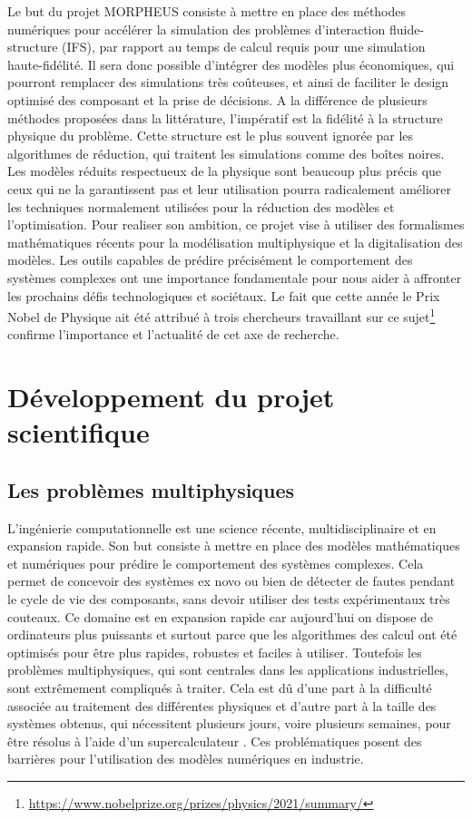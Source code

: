 \documentclass[12pt, french]{article}
\begin{document}
Le but du projet MORPHEUS consiste à mettre en place des méthodes numériques
pour accélérer la simulation des problèmes d'interaction fluide-structure (IFS), par rapport au temps de calcul requis pour une simulation haute-fidélité. Il sera donc possible d'intégrer des modèles plus économiques, qui pourront remplacer des simulations très coûteuses, et ainsi de faciliter le design optimisé des composant et la prise de décisions. A la différence de plusieurs méthodes proposées dans la littérature, l'impératif est la fidélité à la structure physique du problème.  Cette structure est le plus souvent ignorée par les algorithmes de réduction, qui traitent les simulations comme des boîtes noires. Les modèles réduits respectueux de la physique sont beaucoup plus précis que ceux qui ne la garantissent pas et leur utilisation pourra radicalement améliorer les techniques normalement utilisées pour la réduction des modèles et l'optimisation. Pour realiser son ambition, ce projet vise à utiliser des formalismes mathématiques récents pour la modélisation multiphysique et la digitalisation des modèles. Les outils capables de prédire précisément le comportement des systèmes complexes ont une importance fondamentale pour nous aider à affronter les prochains défis technologiques et sociétaux. Le fait que cette année le Prix Nobel de Physique ait été attribué à trois chercheurs travaillant sur ce sujet\footnote{\url{https://www.nobelprize.org/prizes/physics/2021/summary/}} confirme
l'importance et l'actualité de cet axe de recherche.


\section{Développement du projet scientifique}

\subsection{Les problèmes multiphysiques}
L'ingénierie computationnelle est une science récente, multidisciplinaire et en expansion rapide. Son but consiste à mettre en place des modèles mathématiques et numériques pour prédire le comportement des systèmes complexes. Cela permet de concevoir des systèmes ex novo ou bien de détecter de fautes pendant le cycle de vie des composants, sans devoir utiliser des tests expérimentaux très couteaux. Ce domaine est en expansion rapide car aujourd'hui on dispose de ordinateurs plus puissants et surtout parce que les algorithmes des calcul ont été optimisés pour être plus rapides, robustes et faciles à utiliser. Toutefois les problèmes multiphysiques, qui sont centrales dans les applications industrielles, sont extrêmement compliqués à traiter. Cela est d\^u d'une part à la difficulté associée au traitement des différentes physiques et d'autre part à la taille des systèmes obtenus, qui nécessitent plusieurs jours, voire plusieurs semaines, pour être résolus à l'aide d'un supercalculateur \cite{keyes2013}. Ces problématiques posent des barrières pour l'utilisation des modèles numériques en industrie. 
\end{document}

